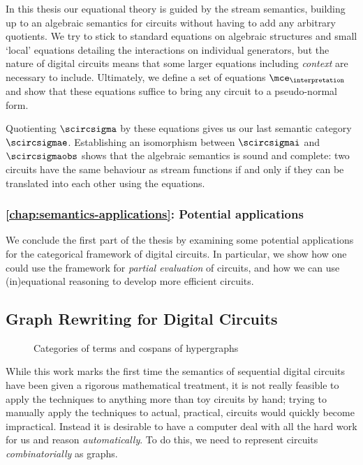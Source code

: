 In this thesis our equational theory is guided by the stream semantics,
building up to an algebraic semantics for circuits without having to add any
arbitrary quotients.
We try to stick to standard equations on algebraic structures and small `local'
equations detailing the interactions on individual generators, but the nature of
digital circuits means that some larger equations including \emph{context} are
necessary to include.
Ultimately, we define a set of equations \(\mce_\interpretation\) and show that
these equations suffice to bring any circuit to a pseudo-normal form.

Quotienting \(\scircsigma\) by these equations gives us our last semantic
category \(\scircsigmae\).
Establishing an isomorphism between \(\scircsigmai\)
and \(\scircsigmaobs\) shows that the algebraic semantics is sound and complete:
two circuits have the same behaviour as stream functions if and only if they
can be translated into each other using the equations.

\subsubsection{\cref{chap:semantics-applications}: Potential applications}

We conclude the first part of the thesis by examining some potential
applications for the categorical framework of digital circuits.
In particular, we show how one could use the framework for
\emph{partial evaluation} of circuits, and how we can use (in)equational
reasoning to develop more efficient circuits.

\subsection{Graph Rewriting for Digital Circuits}

\begin{figure}
    \centering
    
    \caption{Categories of terms and cospans of hypergraphs}
    \label{fig:hypergraphs-map}
\end{figure}

While this work marks the first time the semantics of sequential digital
circuits have been given a rigorous mathematical treatment, it is not really
feasible to apply the techniques to anything more than toy circuits by hand;
trying to manually apply the techniques to actual, practical, circuits would
quickly become impractical.
Instead it is desirable to have a computer deal with all the hard work
for us and reason \emph{automatically}.
To do this, we need to represent circuits \emph{combinatorially} as graphs.

